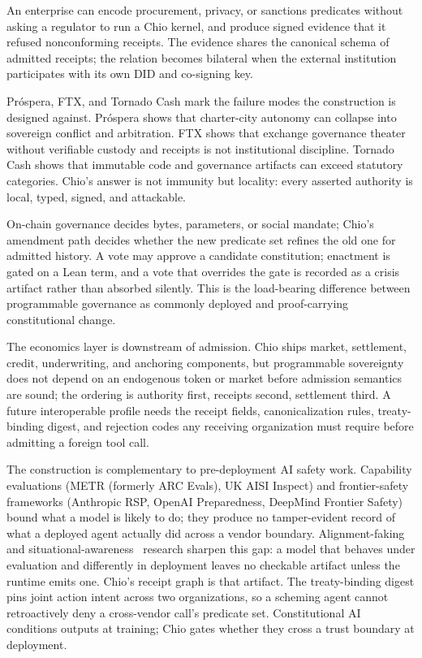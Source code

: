 An enterprise can encode procurement, privacy, or sanctions predicates without asking a regulator to run a Chio kernel, and produce signed evidence that it refused nonconforming receipts. The evidence shares the canonical schema of admitted receipts; the relation becomes bilateral when the external institution participates with its own DID and co-signing key.

Próspera, FTX, and Tornado Cash mark the failure modes the construction is designed against. Próspera shows that charter-city autonomy can collapse into sovereign conflict and arbitration. FTX shows that exchange governance theater without verifiable custody and receipts is not institutional discipline. Tornado Cash shows that immutable code and governance artifacts can exceed statutory categories. Chio's answer is not immunity but locality: every asserted authority is local, typed, signed, and attackable.

On-chain governance decides bytes, parameters, or social mandate; Chio's amendment path decides whether the new predicate set refines the old one for admitted history. A vote may approve a candidate constitution; enactment is gated on a Lean term, and a vote that overrides the gate is recorded as a crisis artifact rather than absorbed silently. This is the load-bearing difference between programmable governance as commonly deployed and proof-carrying constitutional change.

The economics layer is downstream of admission. Chio ships market, settlement, credit, underwriting, and anchoring components, but programmable sovereignty does not depend on an endogenous token or market before admission semantics are sound; the ordering is authority first, receipts second, settlement third. A future interoperable profile needs the receipt fields, canonicalization rules, treaty-binding digest, and rejection codes any receiving organization must require before admitting a foreign tool call.

The construction is complementary to pre-deployment AI safety work. Capability evaluations (METR (formerly ARC Evals), UK AISI Inspect) and frontier-safety frameworks (Anthropic RSP, OpenAI Preparedness, DeepMind Frontier Safety) bound what a model is likely to do; they produce no tamper-evident record of what a deployed agent actually did across a vendor boundary. Alignment-faking~\cite{hubingerAlignmentFaking2024} and situational-awareness~\cite{berglundSituationalAwareness2023} research sharpen this gap: a model that behaves under evaluation and differently in deployment leaves no checkable artifact unless the runtime emits one. Chio's receipt graph is that artifact. The treaty-binding digest pins joint action intent across two organizations, so a scheming agent cannot retroactively deny a cross-vendor call's predicate set. Constitutional AI~\cite{baiConstitutionalAI2022} conditions outputs at training; Chio gates whether they cross a trust boundary at deployment.

